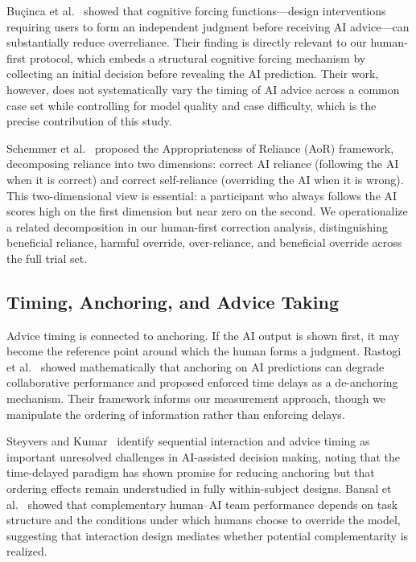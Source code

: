 \documentclass[conference]{IEEEtran}
\begin{document}
Bu\c{c}inca et al.~\cite{bucinca2021trust} showed that cognitive forcing
functions---design interventions requiring users to form an independent
judgment before receiving AI advice---can substantially reduce
overreliance. Their finding is directly relevant to our human-first
protocol, which embeds a structural cognitive forcing mechanism by
collecting an initial decision before revealing the AI prediction.
Their work, however, does not systematically vary the timing of AI advice
across a common case set while controlling for model quality and case
difficulty, which is the precise contribution of this study.

Schemmer et al.~\cite{schemmer2023appropriate} proposed the
Appropriateness of Reliance (AoR) framework, decomposing reliance into
two dimensions: correct AI reliance (following the AI when it is correct)
and correct self-reliance (overriding the AI when it is wrong). This
two-dimensional view is essential: a participant who always follows the AI
scores high on the first dimension but near zero on the second. We
operationalize a related decomposition in our human-first correction
analysis, distinguishing beneficial reliance, harmful override,
over-reliance, and beneficial override across the full trial set.

\subsection{Timing, Anchoring, and Advice Taking}

Advice timing is connected to anchoring. If the AI output is shown first,
it may become the reference point around which the human forms a
judgment. Rastogi et
al.~\cite{rastogi2022deciding} showed mathematically that anchoring on AI
predictions can degrade collaborative performance and proposed enforced
time delays as a de-anchoring mechanism. Their framework informs our
measurement approach, though we manipulate the ordering of information
rather than enforcing delays.

Steyvers and Kumar~\cite{steyvers2024three} identify sequential
interaction and advice timing as important unresolved challenges in
AI-assisted decision making, noting that the time-delayed paradigm has
shown promise for reducing anchoring but that ordering effects remain
understudied in fully within-subject designs. Bansal et
al.~\cite{bansal2021does} showed that complementary human--AI team
performance depends on task structure and the conditions under which
humans choose to override the model, suggesting that interaction design
mediates whether potential complementarity is realized.
\end{document}
